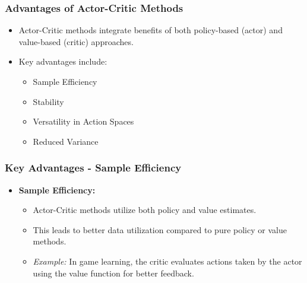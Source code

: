 \documentclass[aspectratio=169]{beamer}
\begin{document}
\begin{frame}[fragile]
    \frametitle{Advantages of Actor-Critic Methods}
    \begin{itemize}
        \item Actor-Critic methods integrate benefits of both policy-based (actor) and value-based (critic) approaches.
        \item Key advantages include:
        \begin{itemize}
            \item Sample Efficiency
            \item Stability
            \item Versatility in Action Spaces
            \item Reduced Variance
        \end{itemize}
    \end{itemize}
\end{frame}

\begin{frame}[fragile]
    \frametitle{Key Advantages - Sample Efficiency}
    \begin{itemize}
        \item \textbf{Sample Efficiency:}
        \begin{itemize}
            \item Actor-Critic methods utilize both policy and value estimates.
            \item This leads to better data utilization compared to pure policy or value methods.
            \item \textit{Example:} In game learning, the critic evaluates actions taken by the actor using the value function for better feedback.
        \end{itemize}
    \end{itemize}
\end{frame}
\end{document}
